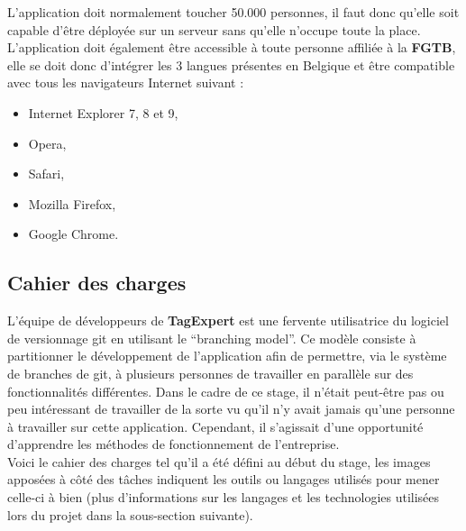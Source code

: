 \documentclass{article}
\begin{document}
\begin{sffamily}
L'application doit normalement toucher 50.000 personnes, il faut donc qu'elle soit capable d'être déployée sur un serveur sans qu'elle n'occupe toute la place.\\
L'application doit également être accessible à toute personne affiliée à la \textbf{FGTB}, elle se doit donc d'intégrer les 3 langues présentes en Belgique et être 
compatible avec tous les navigateurs Internet suivant :
\begin{itemize}
\item Internet Explorer 7, 8 et 9,
\item Opera,
\item Safari,
\item Mozilla Firefox,
\item Google Chrome.
\end{itemize}

\subsection{Cahier des charges}

L'équipe de développeurs de \textbf{TagExpert} est une fervente utilisatrice du logiciel de versionnage git en utilisant le ``branching model''. Ce modèle consiste à 
partitionner le développement de l'application afin de permettre, via le système de branches de git, à plusieurs personnes de travailler en parallèle sur des fonctionnalités 
différentes. Dans le cadre de ce stage, il n'était peut-être pas ou peu intéressant de travailler de la sorte vu qu'il n'y avait jamais qu'une personne à travailler sur 
cette application. Cependant, il s'agissait d'une opportunité d'apprendre les méthodes de fonctionnement de l'entreprise. \\

Voici le cahier des charges tel qu'il a été défini au début du stage, les images apposées à côté des tâches indiquent les outils ou langages utilisés pour mener celle-ci à 
bien (plus d'informations sur les langages et les technologies utilisées lors du projet dans la sous-section suivante).


\end{sffamily}
\end{document}
